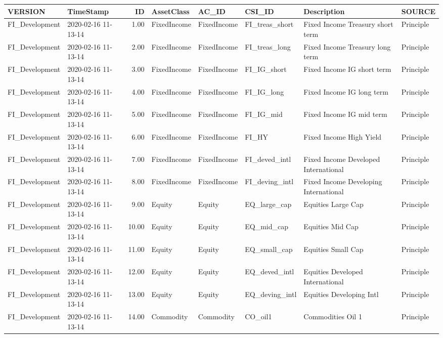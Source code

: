 \begin{longtable}{llrlllll}
  \hline
VERSION & TimeStamp & ID & AssetClass & AC\_ID & CSI\_ID & Description & SOURCE \\ 
  \hline
FI\_Development & 2020-02-16 11-13-14 & 1.00 & FixedIncome & FixedIncome & FI\_treas\_short & Fixed Income Treasury short term & Principle \\ 
  FI\_Development & 2020-02-16 11-13-14 & 2.00 & FixedIncome & FixedIncome & FI\_treas\_long & Fixed Income Treasury long term & Principle \\ 
  FI\_Development & 2020-02-16 11-13-14 & 3.00 & FixedIncome & FixedIncome & FI\_IG\_short & Fixed Income IG short term & Principle \\ 
  FI\_Development & 2020-02-16 11-13-14 & 4.00 & FixedIncome & FixedIncome & FI\_IG\_long & Fixed Income IG long term & Principle \\ 
  FI\_Development & 2020-02-16 11-13-14 & 5.00 & FixedIncome & FixedIncome & FI\_IG\_mid & Fixed Income IG mid term & Principle \\ 
  FI\_Development & 2020-02-16 11-13-14 & 6.00 & FixedIncome & FixedIncome & FI\_HY & Fixed Income High Yield & Principle \\ 
  FI\_Development & 2020-02-16 11-13-14 & 7.00 & FixedIncome & FixedIncome & FI\_deved\_intl & Fixed Income Developed International & Principle \\ 
  FI\_Development & 2020-02-16 11-13-14 & 8.00 & FixedIncome & FixedIncome & FI\_deving\_intl & Fixed Income Developing International & Principle \\ 
  FI\_Development & 2020-02-16 11-13-14 & 9.00 & Equity & Equity & EQ\_large\_cap & Equities Large Cap & Principle \\ 
  FI\_Development & 2020-02-16 11-13-14 & 10.00 & Equity & Equity & EQ\_mid\_cap & Equities Mid Cap & Principle \\ 
  FI\_Development & 2020-02-16 11-13-14 & 11.00 & Equity & Equity & EQ\_small\_cap & Equities Small Cap & Principle \\ 
  FI\_Development & 2020-02-16 11-13-14 & 12.00 & Equity & Equity & EQ\_deved\_intl & Equities Developed International & Principle \\ 
  FI\_Development & 2020-02-16 11-13-14 & 13.00 & Equity & Equity & EQ\_deving\_intl & Equities Developing Intl & Principle \\ 
  FI\_Development & 2020-02-16 11-13-14 & 14.00 & Commodity & Commodity & CO\_oil1 & Commodities Oil 1 & Principle \\ 

\end{longtable}
